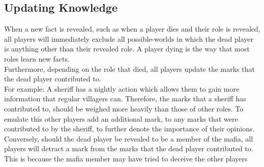 \subsection{Updating Knowledge}\label{UpdatingKnowledge}
When a new fact is revealed, such as when a player dies and their role is
revealed, all players will immediately exclude all possible-worlds in which the
dead player is anything other than their revealed role. A player dying is the
way that most roles learn new facts.\\ Furthermore, depending on the role that
died, all players update the marks that the dead player contributed to.\\ For
example: A sheriff has a nightly action which allows them to gain more
information that regular villagers can. Therefore, the marks that a sheriff has
contributed to, should be weighed more heavily than those of other roles. To
emulate this other players add an additional mark, to any marks that were
contributed to by the sheriff, to further denote the importance of their
opinions. \\ Conversely, should the dead player be revealed to be a member of
the mafia, all players will detract a mark from the marks that the dead player
contributed to. This is because the mafia member may have tried to deceive the
other players
